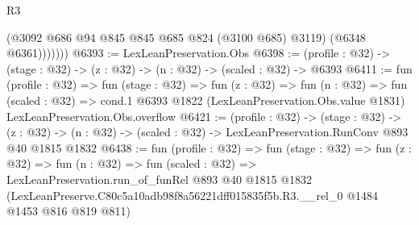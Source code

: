 \begin{lexlean}{R3}
\begin{coremodule}
                (@3092 @686 @94 @845 @845 @685 @824 (@3100 @685) @3119)
                (@6348 @6361)))))))
@6393 := LexLeanPreservation.Obs
@6398 := (profile : @32) -> (stage : @32) -> (z : @32) -> (n : @32) -> (scaled : @32) -> @6393
@6411 := fun (profile : @32) =>
  fun (stage : @32) =>
  fun (z : @32) =>
  fun (n : @32) =>
  fun (scaled : @32) =>
  cond.{1} @6393 @1822 (LexLeanPreservation.Obs.value @1831) LexLeanPreservation.Obs.overflow
@6421 := (profile : @32) ->
  (stage : @32) ->
  (z : @32) -> (n : @32) -> (scaled : @32) -> LexLeanPreservation.RunConv @893 @40 @1815 @1832
@6438 := fun (profile : @32) =>
  fun (stage : @32) =>
  fun (z : @32) =>
  fun (n : @32) =>
  fun (scaled : @32) =>
  LexLeanPreservation.run_of_funRel
    @893
    @40
    @1815
    @1832
    (LexLeanPreserve.C80c5a10adb98f8a56221dff015835f5b.R3.__rel_0 @1484 @1453 @816 @819 @811)
\end{coremodule}
\end{lexlean}
